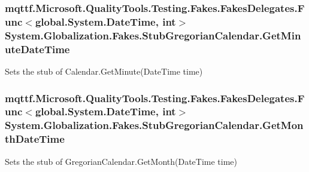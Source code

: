 \hypertarget{class_system_1_1_globalization_1_1_fakes_1_1_stub_gregorian_calendar_ac95444366c3221aa92206aaba34147f8}{
\subsubsection[{Get\-Minute\-Date\-Time}]{\setlength{\rightskip}{0pt plus 5cm}mqttf.\-Microsoft.\-Quality\-Tools.\-Testing.\-Fakes.\-Fakes\-Delegates.\-Func$<$global.\-System.\-Date\-Time, int$>$ System.\-Globalization.\-Fakes.\-Stub\-Gregorian\-Calendar.\-Get\-Minute\-Date\-Time}}\label{class_system_1_1_globalization_1_1_fakes_1_1_stub_gregorian_calendar_ac95444366c3221aa92206aaba34147f8}


Sets the stub of Calendar.\-Get\-Minute(\-Date\-Time time)

\hypertarget{class_system_1_1_globalization_1_1_fakes_1_1_stub_gregorian_calendar_ada39a0ed2e5d9bcd0804f87408cfda20}{
\subsubsection[{Get\-Month\-Date\-Time}]{\setlength{\rightskip}{0pt plus 5cm}mqttf.\-Microsoft.\-Quality\-Tools.\-Testing.\-Fakes.\-Fakes\-Delegates.\-Func$<$global.\-System.\-Date\-Time, int$>$ System.\-Globalization.\-Fakes.\-Stub\-Gregorian\-Calendar.\-Get\-Month\-Date\-Time}}\label{class_system_1_1_globalization_1_1_fakes_1_1_stub_gregorian_calendar_ada39a0ed2e5d9bcd0804f87408cfda20}


Sets the stub of Gregorian\-Calendar.\-Get\-Month(\-Date\-Time time)

